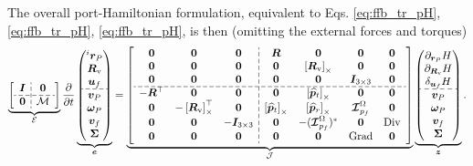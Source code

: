 The overall port-Hamiltonian formulation, equivalent to Eqs. \eqref{eq:ffb_tr_pH}, \eqref{eq:ffb_tr_pH}, \eqref{eq:ffb_tr_pH}, is then (omitting the external forces and torques)
\begin{equation}
\label{eq:ph_mfd_all}
\setlength{\dashlinegap}{2pt}
\underbrace{
	{\left[ \begin{array}{c:c}
		\bm{I} & \bm{0} \\
		\hdashline
		\bm{0} & \mathcal{M} \\
		\end{array} \right]}
}_{\mathcal{E}}
\diffp{}{t}
\underbrace{
	\begin{pmatrix}
	^i \bm{r}_P \\ \bm{R}_{\text{v}} \\ \bm{u}_f \\\hdashline  \bm{v}_P \\ \bm\omega_P  \\ \bm{v}_f  \\ \bm\Sigma \\
	\end{pmatrix}
}_{\bm{e}} = 
\underbrace{
	{\left[ \begin{array}{ccc:cccc}
		\bm{0} & \bm{0} & \bm{0} &  \bm{R} & \bm{0} & \bm{0} & \bm{0} \\
		\bm{0} & \bm{0} & \bm{0} & \bm{0} & \crmat{\bm{R}_{\text{v}}} & \bm{0} & \bm{0} \\
		\bm{0} & \bm{0} & \bm{0} & \bm{0} & \bm{0} & \bm{I}_{3\times 3} & \bm{0}  \\ 
		\hdashline
		-\bm{R}^\top & \bm{0} & \bm{0} & \bm{0} & \crmat{\widehat{\bm{p}}_t} & \bm{0} & \bm{0} \\
		\bm{0} & -\crmat{\bm{R}_{\text{v}}}^\top & \bm{0} & \crmat{\widehat{\bm{p}}_t} & \crmat{\widehat{\bm{p}}_r} & \bm{\mathcal{I}}_{p_f}^\Omega & \bm{0} \\
		\bm{0} & \bm{0} & -\bm{I}_{3\times 3} & \bm{0} & -(\bm{\mathcal{I}}_{p_f}^\Omega)^* & \bm{0} & \Div \\
		\bm{0} & \bm{0} & \bm{0} & \bm{0} & \bm{0} & \Grad & \bm{0} \\
		\end{array} \right]}
}_{\mathcal{J}}
\underbrace{\begin{pmatrix}
	\partial_{\bm{r}_P}H \\ \partial_{\bm{R}_\text{v}}H \\ \delta_{\bm{u}_f} H \\\hdashline  \bm{v}_P \\ \bm\omega_P  \\ \bm{v}_f  \\ \bm\Sigma \\
	\end{pmatrix}}_{\bm{z}}.
\end{equation} 

